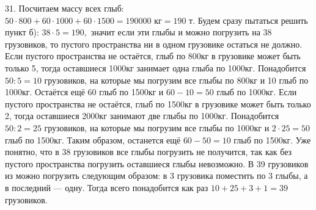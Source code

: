 31. Посчитаем массу всех глыб: $50\cdot800+60\cdot1000+60\cdot1500=190000\text{ кг}=190\text{ т}.$ Будем сразу пытаться решить пункт б): $38\cdot5=190,$ значит если эти глыбы и можно погрузить на 38 грузовиков, то пустого пространства ни в одном грузовике остаться не должно. Если пустого пространства не остаётся, глыб по 800кг в грузовике может быть только 5, тогда оставшиеся 1000кг занимает одна глыба по 1000кг. Понадобится $50:5=10$ грузовиков, на которые мы погрузим все глыбы по 800кг и 10 глыб по 1000кг. Остаётся ещё 60 глыб по 1500кг и $60-10=50$ глыб по 1000кг. Если пустого пространства не остаётся, глыб по 1500кг в грузовике может быть только 2, тогда оставшиеся 2000кг занимают две глыбы по 1000кг. Понадобится $50:2=25$ грузовиков, на которые мы погрузим все глыбы по 1000кг и $2\cdot25=50$ глыб по 1500кг. Таким образом, останется ещё $60-50=10$ глыб по 1500кг. Уже понятно, что в 38 грузовиков все глыбы погрузить не получится, так как без пустого пространства погрузить оставшиеся глыбы невозможно. В 39 грузовиков из можно погрузить следующим образом: в 3 грузовика поместить по 3 глыбы, а в последний --- одну. Тогда всего понадобится как раз $10+25+3+1=39$ грузовиков.\\
